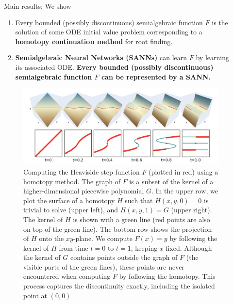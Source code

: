 \documentclass[final]{beamer}
\newlength{\sepwidth}
\newlength{\mcolwidth}
\newcommand{\separatorcolumn}{\begin{column}{\sepwidth}\end{column}}
\begin{document}
\begin{frame}[t]
\begin{columns}[t]
\separatorcolumn

\begin{column}{\mcolwidth}

  \begin{alertblock}{Main results: We show}
    \begin{enumerate}
      \item Every bounded (possibly discontinuous) semialgebraic function $F$ is the solution of some ODE initial value problem corresponding to a \textbf{homotopy continuation method} for root finding.
      \item \textbf{Semialgebraic Neural Networks (SANNs)} can learn $F$ by learning its associated ODE. \textbf{Every bounded (possibly discontinuous) semialgebraic function $F$ can be represented by a SANN.}
    \end{enumerate}
\end{alertblock}

  \begin{figure}
    \centering
    \includegraphics[width=\linewidth]{images/heaviside_homotopy.png}
    \caption*{
      Computing the Heaviside step function $F$ (plotted in red) using a homotopy method. 
      The graph of $F$ is a subset of the kernel of a higher-dimensional piecewise polynomial $G$.
      In the upper row, we plot the surface of a homotopy $H$ such that $H(x,y,0)=0$ is trivial to solve (upper left), and $H(x,y,1)=G$ (upper right).
      The kernel of $H$ is shown with a green line (red points are also on top of the green line).
      The bottom row shows the projection of $H$ onto the $xy$-plane.
      We compute $F(x)=y$ by following the kernel of $H$ from time $t=0$ to $t=1$, keeping $x$ fixed.
      Although the kernel of $G$ contains points outside the graph of $F$ (the visible parts of the green lines), these points are never encountered when computing $F$ by following the homotopy.
      This process captures the discontinuity exactly, including the isolated point at $(0,0)$. 
    }
  \end{figure}


\end{column}
\end{columns}
\end{frame}
\end{document}
